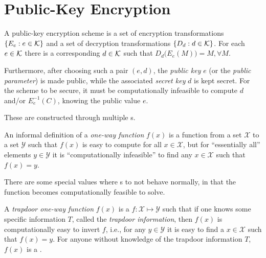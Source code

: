 \section{Public-Key Encryption}\label{sec:Public_Key_Encryption}
\begin{definition}\label{def:Public_Key_Encryption_Scheme}
  A public-key encryption scheme is a set of encryption transformations $\lbrace E_{e} : e \in \operatorname{\mathcal{K}} \rbrace$ and a set of decryption transformations $\lbrace D_{d} : d \in \operatorname{\mathcal{K}} \rbrace$.
  For each $e \in \operatorname{\mathcal{K}}$ there is a corresponding $d \in \operatorname{\mathcal{K}}$ such that $D_{d} \bigl(E_{e} (M) \bigr) = M,  \forall M$.

  Furthermore, after choosing such a pair $(e, d)$, the \emph{public key} $e$ (or the \emph{public parameter}) is made public, while the associated \emph{secret key} $d$ is kept secret.
  For the scheme to be secure, it must be computationally infeasible to compute $d$ and/or $E_{e}^{-1}(C)$, knowing the public value $e$.

  \begin{remark}[Construction]
    These are constructed through multiple s.
  \end{remark}
\end{definition}

\begin{definition}\label{def:One_Way_Function}
  An informal definition of a \emph{one-way function} $f(x)$ is a function from a set $\mathcal{X}$ to a set $\mathcal{Y}$ such that $f(x)$ is easy to compute for all $x \in \mathcal{X}$, but for ``essentially all'' elements $y \in \mathcal{Y}$ it is ``computationally infeasible'' to find any $x \in \mathcal{X}$ such that $f(x) = y$.

  \begin{remark}\label{rmk:One_Way_Function-Essentially_All}
    There are some special values where s to not behave normally, in that the function becomes computationally feasible to solve.
  \end{remark}
\end{definition}

\begin{definition}\label{def:Trapdoor_One_Way_Function}
  A \emph{trapdoor one-way function} $f(x)$ is a  $f : \mathcal{X} \mapsto \mathcal{Y}$ such that if one knows some specific information $T$, called the \emph{trapdoor information}, then $f(x)$ is computationally easy to invert $f$, i.e., for any $y \in \mathcal{Y}$ it is easy to find a $x \in \mathcal{X}$ such that $f(x) = y$.
  For anyone without knowledge of the trapdoor information $T$, $f(x)$ is a .
\end{definition}


